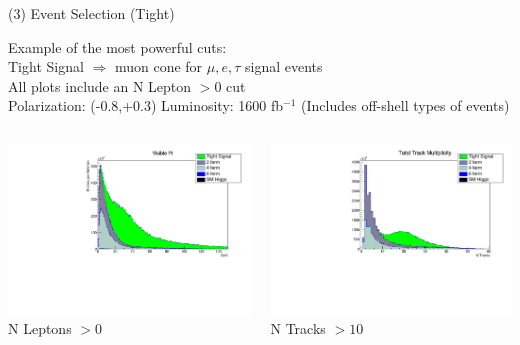 \documentclass[10pt]{beamer}
\begin{document}
\begin{frame}{(3) Event Selection (Tight)}

Example of the most powerful cuts:\\
\scriptsize
Tight Signal $\Rightarrow$  muon cone for $\mu,e,\tau$ signal events\\
All plots include an N Lepton $> 0$ cut \\
Polarization: (-0.8,+0.3)\quad
Luminosity: 1600 fb$^{-1}$
(Includes off-shell types of events)
\begin{columns}
\begin{column}{0.5\textwidth}
\includegraphics[scale=0.3, left]{PtvisHist.pdf} \\
N Leptons $> 0$
\end{column}
\begin{column}{0.5\textwidth}
\includegraphics[scale=0.3, left]{ntracksHist.pdf} \\
N Tracks $> 10$
\end{column}
\end{columns}
\end{frame}
\end{document}
